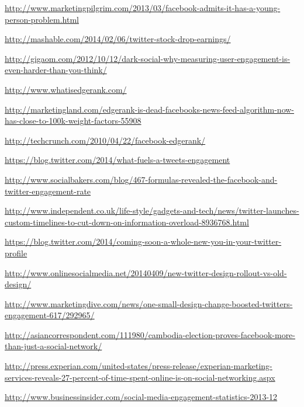 \begin{thebibliography}{9}

\url{http://www.marketingpilgrim.com/2013/03/facebook-admits-it-has-a-young-person-problem.html}

\url{http://mashable.com/2014/02/06/twitter-stock-drop-earnings/}

\url{http://gigaom.com/2012/10/12/dark-social-why-measuring-user-engagement-is-even-harder-than-you-think/}

\url{http://www.whatisedgerank.com/}

\url{http://marketingland.com/edgerank-is-dead-facebooks-news-feed-algorithm-now-has-close-to-100k-weight-factors-55908}

\url{http://techcrunch.com/2010/04/22/facebook-edgerank/}


\url{https://blog.twitter.com/2014/what-fuels-a-tweets-engagement}

\url{http://www.socialbakers.com/blog/467-formulas-revealed-the-facebook-and-twitter-engagement-rate}


\url{http://www.independent.co.uk/life-style/gadgets-and-tech/news/twitter-launches-custom-timelines-to-cut-down-on-information-overload-8936768.html}

\url{https://blog.twitter.com/2014/coming-soon-a-whole-new-you-in-your-twitter-profile}

\url{http://www.onlinesocialmedia.net/20140409/new-twitter-design-rollout-vs-old-design/}

\url{http://www.marketingdive.com/news/one-small-design-change-boosted-twitters-engagement-617/292965/}


\url{http://asiancorrespondent.com/111980/cambodia-election-proves-facebook-more-than-just-a-social-network/}

\url{http://press.experian.com/united-states/press-release/experian-marketing-services-reveals-27-percent-of-time-spent-online-is-on-social-networking.aspx}

\url{http://www.businessinsider.com/social-media-engagement-statistics-2013-12}


\end{thebibliography}

